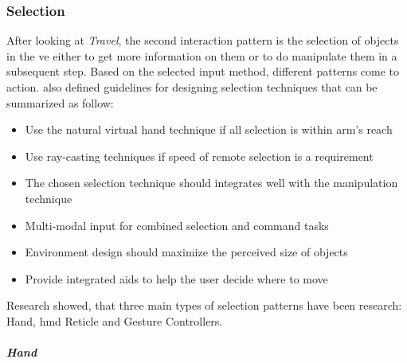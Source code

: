 
\subsubsection{Selection}

After looking at \textit{Travel}, the second interaction pattern is the selection of objects in the \gls{ve} either to get more information on them or to do manipulate them in a subsequent step. Based on the selected input method, different patterns come to action. \newline
\cite{Bowman2002} also defined guidelines for designing selection techniques that can be summarized as follow:
\begin{itemize}[noitemsep,nolistsep]
	\item Use the natural virtual hand technique if all selection is within arm's reach
	\item Use ray-casting techniques if speed of remote selection is a requirement
	\item The chosen selection technique should integrates well with the manipulation technique
	\item Multi-modal input for combined selection and command tasks
	\item Environment design should maximize the perceived size of objects
	\item Provide integrated aids to help the user decide where to move
\end{itemize}

Research showed, that three main types of selection patterns have been research: Hand, \gls{hmd} Reticle and Gesture Controllers.

\subparagraph{Hand}

